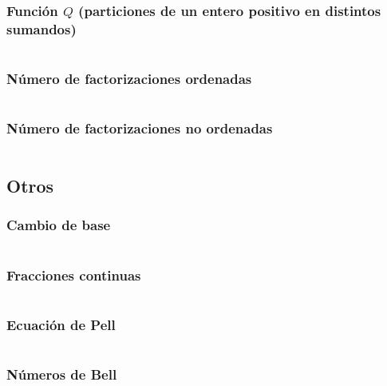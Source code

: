 \documentclass[11pt]{article}
\begin{document}
			\subsubsection{Función $Q$ (particiones de un entero positivo en distintos sumandos)}
			\inputminted[tabsize=2,breaklines,firstline=549,lastline=596,fontsize=\small]{c++}{numberTheory.cpp}
			
			\subsubsection{Número de factorizaciones ordenadas}
			\inputminted[tabsize=2,breaklines,firstline=743,lastline=771,fontsize=\small]{c++}{numberTheory.cpp}
			
			\subsubsection{Número de factorizaciones no ordenadas}
			\inputminted[tabsize=2,breaklines,firstline=773,lastline=799,fontsize=\small]{c++}{numberTheory.cpp}
			
		\subsection{Otros}
			\subsubsection{Cambio de base}
			\inputminted[tabsize=2,breaklines,firstline=442,lastline=462,fontsize=\small]{c++}{numberTheory.cpp}
			
			\subsubsection{Fracciones continuas}
			\inputminted[tabsize=2,breaklines,firstline=598,lastline=640,fontsize=\small]{c++}{numberTheory.cpp}
			
			\subsubsection{Ecuación de Pell}
			\inputminted[tabsize=2,breaklines,firstline=642,lastline=655,fontsize=\small]{c++}{numberTheory.cpp}
			
			\subsubsection{Números de Bell}
			\inputminted[tabsize=2,breaklines,firstline=894,lastline=906,fontsize=\small]{c++}{numberTheory.cpp}
			
\end{document}
